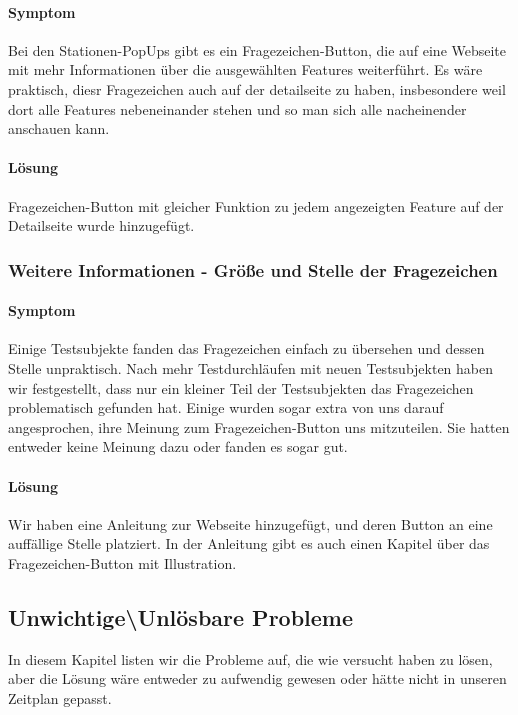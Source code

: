       \paragraph{Symptom}
      Bei den Stationen-PopUps gibt es ein Fragezeichen-Button, die auf eine Webseite mit mehr Informationen über die ausgewählten Features weiterführt. Es wäre praktisch, diesr Fragezeichen auch auf der detailseite zu haben, insbesondere weil dort alle Features nebeneinander stehen und so man sich alle nacheinender anschauen kann.

      \paragraph{Lösung}
      Fragezeichen-Button mit gleicher Funktion zu jedem angezeigten Feature auf der Detailseite wurde hinzugefügt.

    \subsubsection*{Weitere Informationen - Größe und Stelle der Fragezeichen}

      \paragraph{Symptom}
      Einige Testsubjekte fanden das Fragezeichen einfach zu übersehen und dessen Stelle unpraktisch. Nach mehr Testdurchläufen mit neuen Testsubjekten haben wir festgestellt, dass nur ein kleiner Teil der Testsubjekten das Fragezeichen problematisch gefunden hat. Einige wurden sogar extra von uns darauf angesprochen, ihre Meinung zum Fragezeichen-Button uns mitzuteilen. Sie hatten entweder keine Meinung dazu oder fanden es sogar gut.

      \paragraph{Lösung}
      Wir haben eine Anleitung zur Webseite hinzugefügt, und deren Button an eine auffällige Stelle platziert. In der Anleitung gibt es auch einen Kapitel über das Fragezeichen-Button mit Illustration. 


    \subsection*{Unwichtige\textbackslash Unlösbare Probleme}

      In diesem Kapitel listen wir die Probleme auf, die wie versucht haben zu lösen, aber die Lösung wäre entweder zu aufwendig gewesen oder hätte nicht in unseren Zeitplan gepasst.


